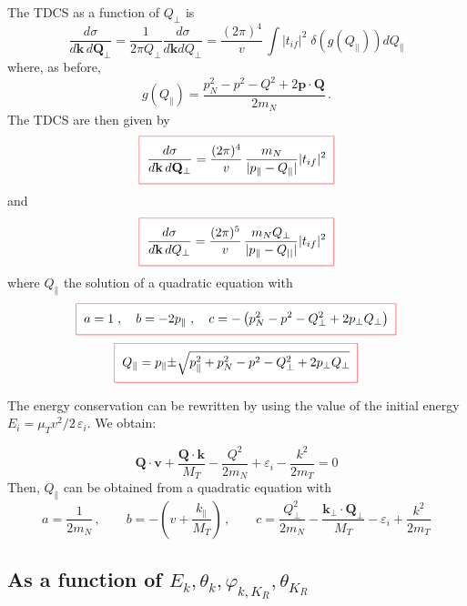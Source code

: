 The TDCS as a function of $Q_{\perp}$ is
%
\begin{equation}\label{Q:5xskQperp}
\frac{d \sigma}{d \bm{k} \, d \bm{Q}_{\perp}} = \frac{1}{2 \pi
Q_{\perp}} \frac{d \sigma}{d \bm{k} d Q_{\perp}} = \frac{(2
\pi)^{4}}{v} \, \int | t_{if}| ^{2} \; \delta \left( g(Q_{|
| }) \right) d Q_{\parallel }
\end{equation}
%
where, as before,
%
$$
g(Q_{\parallel }) = \frac{p_{N}^{2} - p^{2} - Q^{2} + 2 \bm{p}\cdot
\bm{Q}}{2 m_{N}} \, .
$$
%
The TDCS are then given by
\begin{equation}\label{Q:tdcsperp}
  \fbeq{
\frac{d \sigma}{d \bm{k} \, d \bm{Q}_{\perp}} = \frac{(2
\pi)^{4}}{v} \, \frac{m_{N}}{| p_{\parallel }- Q_{\parallel } |
}| t_{if}|^{2}
  }
\end{equation}
%
and
\begin{equation}\label{Q:tdcsperp1}
  \fbeq{
\frac{d \sigma}{d \bm{k} \, d Q_{\perp}} = \frac{(2
\pi)^{5}}{v} \, \frac{m_{N} Q_{\perp}}{| p_{\parallel }- Q_{|
| } | }| t_{if}| ^{2}
  }
\end{equation}
%
where $Q_{\parallel}$ the solution of a quadratic equation with
%
$$
  \fbeq{
a=1\;, \quad b= - 2 p_{\parallel } \;, \quad c= - \left( p_{N}^{2} -
p^{2} - Q_{\perp}^{2} + 2 p_{\perp} Q_{\perp} \right)
  }
$$
\begin{equation}\label{Q:qpar}
  \fbeq{
Q_{\parallel } =  p_{\parallel } {\pm} \sqrt{p_{\parallel }^{2} +
p_{N}^{2} - p^{2} - Q_{\perp}^{2} + 2 p_{\perp} Q_{\perp}}
    }
\end{equation}

\noindent
 The energy conservation can be rewritten by using the value of the
initial energy $E_{i}=\mu_{T} v^{2}/2 \, \varepsilon_{i}$. We obtain:

\begin{equation}\label{Q:EC1}
\bm{Q} \cdot \bm{v} + \frac{\bm{Q}\cdot \bm{k}}{M_{T}} - \frac{Q^{2}}{2
m_{N}} + \varepsilon_{i} - \frac{k^{2}}{2 m_{T}} = 0
\end{equation}
%
Then, $Q_{\parallel }$ can be obtained from a quadratic equation with
$$
a=\frac{1}{2 m_{N}} \, , \qquad b= -\left( v + \frac{k_{\parallel
}}{M_{T}} \right) \, , \qquad c= \frac{Q^{2}_{\perp}}{2 m_{N}} -
\frac{\bm{k}_{\perp} \cdot \bm{Q}_{\perp}}{M_{T}} - \varepsilon_{i} +
\frac{k^{2}}{2 m_{T}}
$$

\subsection{As a function of $ E_{k}, \theta_{k}, \varphi_{k,K_{R}},\theta_{K_{R}}$}


